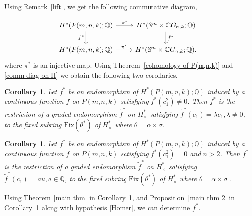 \documentclass{amsart}
\newtheorem{corollary}[theorem]{Corollary}
\newcommand{\thmref}[1]{Theorem~\ref{#1}}
\newcommand{\propref}[1]{Proposition~\ref{#1}}
\newcommand{\corref}[1]{Corollary~\ref{#1}}
\newcommand{\remref}[1]{Remark~\ref{#1}}
\begin{document}
	Using \remref{lift}, we get the following commutative %
diagram,
	
	\begin{equation}\label{comm diag on H}
		\begin{tikzcd}
			{H^*(P(m,n,k);\mathbb Q)}  & {H^*(\mathbb S^m\times \mathbb CG_{n,k};\mathbb Q)} \\
			{H^*(P(m,n,k);\mathbb Q)} & {H^*(\mathbb S^m\times \mathbb CG_{n,k};\mathbb Q).}
			\arrow["{\pi^*}", from=1-1, to=1-2]
			\arrow["{f^*}"', from=1-1, to=2-1]
			\arrow["{\bar f^*}", from=1-2, to=2-2]
			\arrow["{\pi^*}", from=2-1, to=2-2]
		\end{tikzcd}
	\end{equation}
	where $\pi^*$ is an injective map. Using \thmref{cohomology of P(m,n,k)} and \eqref{comm diag on H} we obtain the following two corollaries. 
	\begin{corollary}\label{cor3}
		Let %
$f^*$ be an endomorphism of $H^*(P(m,n,k); \mathbb{Q})$ induced by a continuous function $f$ on $P(m,n,k)$ satisfying $f^*(c_1^2) \ne 0$. Then
		$f^*$ is the restriction of a graded endomorphism $\tilde{f}^*$ on  $H^*_\times$ satisfying $\tilde{f}^*(c_1) = \lambda c_1, \lambda \neq 0$,  to the fixed subring $\mathrm{Fix}(\theta^*)$ %
of $H^*_\times$ where %
$\theta = \alpha\times \sigma$.
	\end{corollary}
	\begin{corollary}\label{cor4}
		Let $f^*$ be an endomorphism of $H^*(P(m,n,k); \mathbb{Q})$ induced by a continuous function $f$ on $P(m,n,k)$ satisfying $f^*(c_1^2) =0$ and $n>2$. Then
		$f^*$ is the restriction of a graded endomorphism $\tilde{f}^*$ on  $H^*_\times$ satisfying $\tilde{f}^*(c_1) = au, a \in \mathbb{Q}$,  to the fixed subring $\mathrm{Fix}(\theta^*)$ %
of $H^*_\times$ where %
$\theta = \alpha\times \sigma$%
.
	\end{corollary}
	Using \thmref{main thm} in \corref{cor3}, and \propref{main thm 2} in \corref{cor4} along %
with hypothesis \eqref{Homer}, we can determine $f^*$.
	
\end{document}
